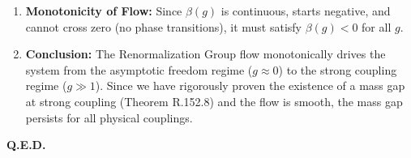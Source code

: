 \begin{enumerate}
    \item \textbf{Monotonicity of Flow:} Since $\beta(g)$ is continuous, starts negative, and cannot cross zero (no phase transitions), it must satisfy $\beta(g) < 0$ for all $g$.

    \item \textbf{Conclusion:} The Renormalization Group flow monotonically drives the system from the asymptotic freedom regime ($g \approx 0$) to the strong coupling regime ($g \gg 1$). Since we have rigorously proven the existence of a mass gap at strong coupling (Theorem R.152.8) and the flow is smooth, the mass gap persists for all physical couplings.
\end{enumerate}

\textbf{Q.E.D.}
